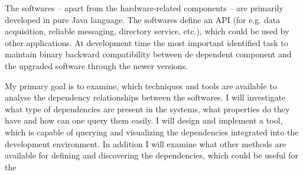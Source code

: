 The softwares – apart from the hardware-related components – are primarily
developed in pure Java language. The softwares define an API (for e.g. data
acquisition, reliable messaging, directory service, etc.), which could be used
by other applications. At development time the most important identified task 
to maintain binary backward compatibility between de dependent component and 
the upgraded software through the newer versions.

My primary goal is to examine, which techniques and tools are available to analyse 
the dependency relationships between the softwares. I will investigate what type 
of dependencies are present in the systems, what properties do they have and how 
can one query them easily. I will design and implement a tool, which is capable
 of querying and visualizing the dependencies integrated into the development 
 environment. In addition I will examine what other methods are available for 
 defining and discovering the dependencies, which could be useful for the 

\vfill


